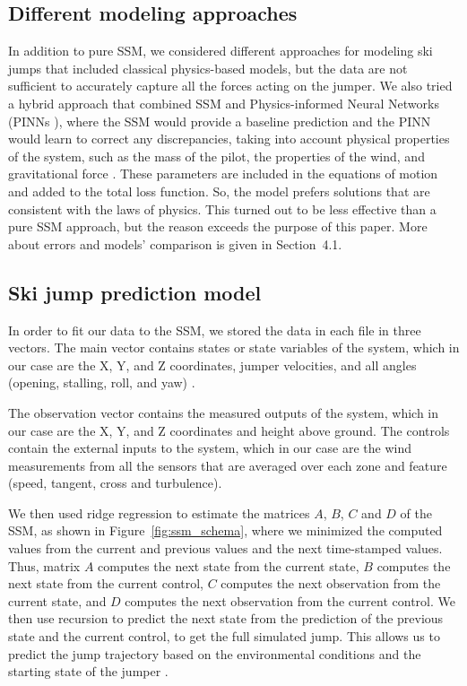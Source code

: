 \documentclass[sigconf]{acmart}
\begin{document}
\subsection{Different modeling approaches}
In addition to pure SSM, we considered different approaches for modeling ski
jumps that included classical physics-based models, but the data are not
sufficient to accurately capture all the forces acting on the jumper. We also
tried a hybrid approach that combined SSM and Physics-informed Neural Networks
(PINNs \cite{cai2021}), where the SSM would provide a baseline prediction and
the PINN would learn to correct any discrepancies, taking into account physical
properties of the system, such as the mass of the pilot, the properties of the
wind, and gravitational force \cite{mueller2006}. These parameters are included
in the equations of motion and added to the total loss function. So, the model
prefers solutions that are consistent with the laws of physics. This turned out
to be less effective than a pure SSM approach, but the reason exceeds the
purpose of this paper. More about errors and models’ comparison is given in
Section~4.1.

\subsection{Ski jump prediction model}
In order to fit our data to the SSM, we stored the data in each file in three
vectors. The main vector contains states or state variables of the system,
which in our case are the X, Y, and Z coordinates, jumper velocities, and all
angles (opening, stalling, roll, and yaw) \cite{mueller2006}.

The observation vector contains the measured outputs of the system, which in
our case are the X, Y, and Z coordinates and height above ground. The controls
contain the external inputs to the system, which in our case are the wind
measurements from all the sensors that are averaged over each zone and feature
(speed, tangent, cross and turbulence).

We then used ridge regression to estimate the matrices $A$, $B$, $C$ and $D$ of
the SSM, as shown in Figure~\ref{fig:ssm_schema}, where we minimized the
computed values from the current and previous values and the next time-stamped
values. Thus, matrix $A$ computes the next state from the current state, $B$
computes the next state from the current control, $C$ computes the next
observation from the current state, and $D$ computes the next observation from
the current control. We then use recursion to predict the next state from the
prediction of the previous state and the current control, to get the full
simulated jump. This allows us to predict the jump trajectory based on the
environmental conditions and the starting state of the jumper \cite{serranno2025}.
\end{document}
